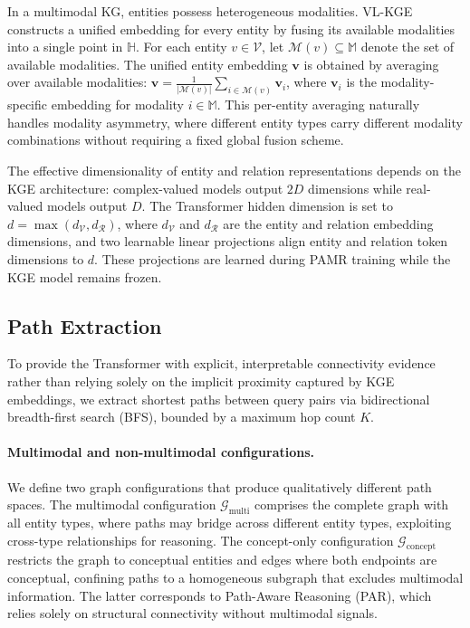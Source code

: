 \documentclass[runningheads]{llncs}
\begin{document}
In a multimodal KG, entities possess heterogeneous modalities.
VL-KGE~\cite{efthymiou2026vlkge} constructs a unified embedding for
every entity by fusing its available modalities into a single point
in $\mathbb{H}$.  For each entity $v \in \mathcal{V}$, let
$\mathcal{M}(v) \subseteq \mathbb{M}$ denote the set of available
modalities.  The unified entity embedding $\mathbf{v}$ is obtained
by averaging over available modalities:
$\mathbf{v} = \frac{1}{|\mathcal{M}(v)|} \sum_{i \in \mathcal{M}(v)} \mathbf{v}_i$,
where $\mathbf{v}_i$ is the modality-specific embedding for modality
$i \in \mathbb{M}$.  This per-entity averaging naturally handles
modality asymmetry, where different entity types carry different
modality combinations without requiring a fixed global fusion scheme.

The effective dimensionality of entity and relation representations
depends on the KGE architecture: complex-valued models output $2D$
dimensions while real-valued models output $D$. The Transformer
hidden dimension is set to $d = \max(d_{\mathcal{V}},
d_{\mathcal{R}})$, where $d_{\mathcal{V}}$ and $d_{\mathcal{R}}$ are the
entity and relation embedding dimensions, and two learnable linear
projections align entity
and relation token dimensions to $d$. These
projections are learned during PAMR training while the KGE model
remains frozen.

\subsection{Path Extraction}
\label{sec:path-extraction}

To provide the Transformer with explicit, interpretable connectivity evidence rather than
relying solely on the implicit proximity captured by KGE embeddings, we extract shortest
paths between query pairs via bidirectional breadth-first search (BFS), bounded by a
maximum hop count $K$.

\paragraph{Multimodal and non-multimodal configurations.}
We define two graph configurations that produce qualitatively different path spaces.
The multimodal configuration $\mathcal{G}_{\text{multi}}$ comprises the complete
graph with all entity types, where paths may bridge across different entity types,
exploiting cross-type relationships for reasoning.  The concept-only configuration
$\mathcal{G}_{\text{concept}}$ restricts the graph to conceptual entities and
edges where both endpoints are conceptual, confining paths to a homogeneous
subgraph that excludes multimodal information.  The latter corresponds to
Path-Aware Reasoning (PAR), which relies solely on structural connectivity
without multimodal signals.
\end{document}
